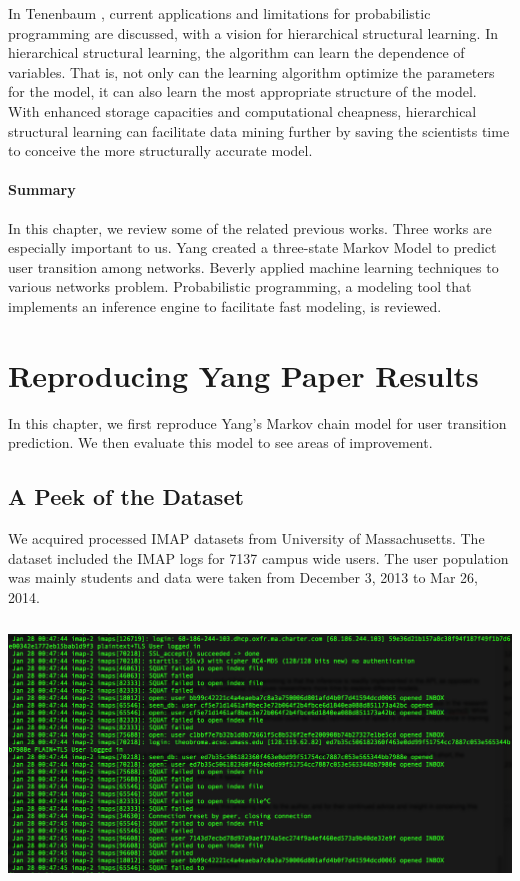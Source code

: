 \documentclass[]{article}
\newenvironment{Figure}
  {\par\medskip\noindent\minipage{\linewidth}}
  {\endminipage\par\medskip}
\begin{document}
In Tenenbaum \cite{tenenbaum}, current applications and limitations for probabilistic programming are discussed, with a vision for hierarchical structural learning. In hierarchical structural learning, the algorithm can learn the dependence of variables. That is, not only can the learning algorithm optimize the parameters for the model, it can also learn the most appropriate structure of the model. With enhanced storage capacities and computational cheapness, hierarchical structural learning can facilitate data mining further by saving the scientists time to conceive the more structurally accurate model.

\paragraph{Summary}
In this chapter, we review some of the related previous works. Three works are especially important to us. Yang\cite{yang} created a three-state Markov Model to predict user transition among networks. Beverly\cite{beverly} applied machine learning techniques to various networks problem. Probabilistic programming, a modeling tool that implements an inference engine to facilitate fast modeling, is reviewed.

\newpage


\section{Reproducing Yang Paper Results}
In this chapter, we first reproduce Yang's Markov chain model for user transition prediction. We then evaluate this model to see areas of improvement.

\subsection{A Peek of the Dataset}

We acquired processed IMAP datasets from University of Massachusetts. The dataset included the IMAP logs for 7137 campus wide users. The user population was mainly students \cite{yang} and data were taken from December 3, 2013 to Mar 26, 2014.

\begin{Figure}
 \centering
 \includegraphics[height = 7cm, width =15cm]{imapSample.png}
 \end{Figure}
 
\end{document}
